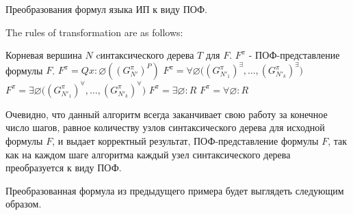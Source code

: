\documentclass[a4paper,12pt]{article}
\begin{document}
\renewcommand{\algorithmicrequire}{\textbf{Input:}}
\renewcommand{\algorithmicensure}{\textbf{Output:}}
\begin{algorithm}
\caption{ Преобразования формул языка ИП к виду ПОФ.}

The rules of transformation are as follows:


\begin{algorithmic}
\REQUIRE Корневая вершина $N$ cинтаксического дерева $T$ для $F$.
\ENSURE $F^{\pi}$ - ПОФ-представление формулы $F$.
  \RETURN  $F^{\pi} = Qx\colon\varnothing ( (G_{N'}^{\pi})^{P} )$   
\ENDIF
{}
  \RETURN  $F^{\pi} = \forall\varnothing \bigl( (G_{N'_1}^{\pi})^{\exists},\ldots,(G_{N'_k}^{\pi})^{\exists}\bigr)$
\ENDIF
{}
  \RETURN  $F^{\pi} = \exists\varnothing \bigl( (G_{N'_1}^{\pi})^{\forall},\ldots,(G_{N'_k}^{\pi})^{\forall}\bigr)$
\ENDIF
{}
  \RETURN  $F^{\pi} = \exists\varnothing\colon R$
\ENDIF
{}
  \RETURN  $F^{\pi} = \forall\varnothing\colon R$
\ENDIF
\end{algorithmic}
\end{algorithm}
Очевидно, что данный алгоритм всегда заканчивает свою работу за конечное число шагов, равное количеству узлов синтаксического дерева для исходной формулы $F$, и выдает корректный результат, ПОФ-представление формулы $F$, так как на каждом шаге алгоритма каждый узел синтаксического дерева преобразуется к виду ПОФ.

Преобразованная формула из предыдущего примера будет выглядеть следующим образом.

\begin{center}
\end{center}
\end{document}
